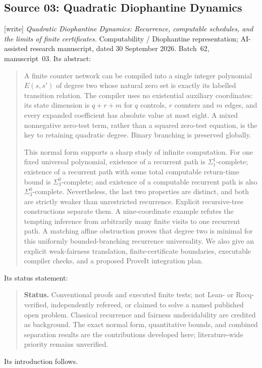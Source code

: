 \documentclass[11pt,letterpaper]{article}
\theoremstyle{definition}
\theoremstyle{remark}
\newcommand{\1}{\mathbf 1}
\newcommand{\wtag}{\textup{[write]}}%
\begin{document}
\subsection{Source 03: Quadratic Diophantine Dynamics}\label{lbh:sec:ms03}
\wtag{} \emph{Quadratic Diophantine Dynamics: Recurrence, computable schedules, and the limits of
finite certificates.} Computability / Diophantine representation; AI-assisted research
manuscript, dated 30 September 2026. Batch~62, manuscript~03. Its abstract:
\begin{quote}\small
A finite counter network can be compiled into a single integer polynomial
$E(s,s')$ of degree two whose natural zero set is exactly its labelled
transition relation. The compiler uses no existential auxiliary coordinates:
its state dimension is $q+r+m$ for $q$ controls, $r$ counters and $m$ edges,
and every expanded coefficient has absolute value at most eight. A mixed
nonnegative zero-test term, rather than a squared zero-test equation, is the
key to retaining quadratic degree. Binary branching is preserved globally.

This normal form supports a sharp study of infinite computation. For one fixed
universal polynomial, existence of a recurrent path is $\Sigma^1_1$-complete;
existence of a recurrent path with some total computable return-time bound is
$\Sigma^0_3$-complete; and existence of a computable recurrent path is also
$\Sigma^0_3$-complete. Nevertheless, the last two properties are distinct, and
both are strictly weaker than unrestricted recurrence. Explicit recursive-tree
constructions separate them. A nine-coordinate example refutes the tempting
inference from arbitrarily many finite visits to one recurrent path. A
matching affine obstruction proves that degree two is minimal for this
uniformly bounded-branching recurrence universality. We also give an explicit
weak-fairness translation, finite-certificate boundaries, executable compiler
checks, and a proposed ProveIt integration plan.
\end{quote}
Its status statement:
\begin{quote}\small
\noindent\textbf{Status.} Conventional proofs and executed finite tests; not Lean- or
Rocq-verified, independently refereed, or claimed to solve a named published
open problem. Classical recurrence and fairness undecidability are credited
as background. The exact normal form, quantitative bounds, and combined
separation results are the contributions developed here; literature-wide
priority remains unverified.
\end{quote}
Its introduction follows.
\end{document}
